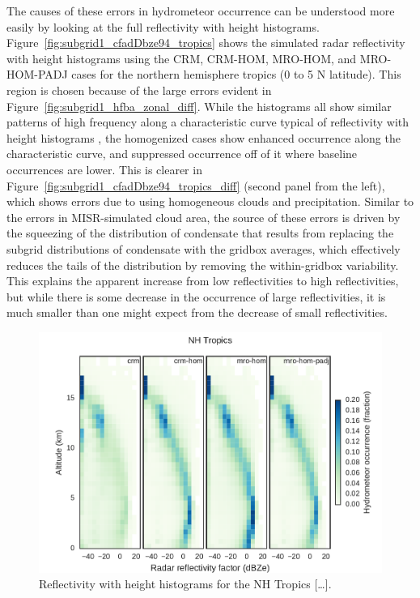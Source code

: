 The causes of these errors in hydrometeor occurrence can be understood
more easily by looking at the full reflectivity with height histograms.
Figure~\ref{fig:subgrid1_cfadDbze94_tropics} shows the simulated radar
reflectivity with height histograms using the CRM, CRM-HOM, MRO-HOM, and
MRO-HOM-PADJ cases for the northern hemisphere tropics (0 to 5 N
latitude). This region is chosen because of the large errors evident in
Figure~\ref{fig:subgrid1_hfba_zonal_diff}. While the histograms all show
similar patterns of high frequency along a characteristic curve typical
of reflectivity with height histograms
\citep[e.g.;][]{marchand_et_al_2009}, the homogenized cases show
enhanced occurrence along the characteristic curve, and suppressed
occurrence off of it where baseline occurrences are lower. This is
clearer in Figure~\ref{fig:subgrid1_cfadDbze94_tropics_diff} (second
panel from the left), which shows errors due to using homogeneous clouds
and precipitation. Similar to the errors in MISR-simulated cloud area,
the source of these errors is driven by the squeezing of the
distribution of condensate that results from replacing the subgrid
distributions of condensate with the gridbox averages, which effectively
reduces the tails of the distribution by removing the within-gridbox
variability. This explains the apparent increase from low reflectivities
to high reflectivities, but while there is some decrease in the
occurrence of large reflectivities, it is much smaller than one might
expect from the decrease of small reflectivities.

\begin{figure}[htbp]
\centering
\includegraphics{graphics/subgrid1_cfadDbze94_NHTropics.pdf}
\caption{\label{fig:subgrid1_cfadDbze94_tropics}Reflectivity with height
histograms for the NH Tropics
{[}\ldots{}{]}.}\label{fig:subgrid1ux5fcfadDbze94ux5ftropics}
\end{figure}

